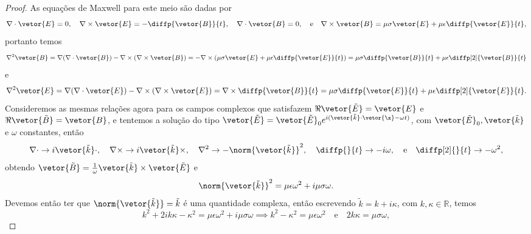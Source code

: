 \begin{proof}
    As equações de Maxwell para este meio são dadas por
    \begin{equation*}
        \nabla \cdot \vetor{E} = 0,\quad
        \nabla \times \vetor{E} = -\diffp{\vetor{B}}{t},\quad
        \nabla \cdot \vetor{B} = 0,\quad\text{e}\quad
        \nabla \times \vetor{B} = \mu \sigma \vetor{E} + \mu \epsilon \diffp{\vetor{E}}{t},
    \end{equation*}
    portanto temos
    \begin{equation*}
        \nabla^2 \vetor{B} = \nabla ( \nabla \cdot \vetor{B}) - \nabla \times (\nabla \times \vetor{B}) = - \nabla \times \left(\mu \sigma \vetor{E} + \mu \epsilon \diffp{\vetor{E}}{t}\right) = \mu \sigma \diffp{\vetor{B}}{t} + \mu \epsilon \diffp[2]{\vetor{B}}{t}
    \end{equation*}
    e
    \begin{equation*}
        \nabla^2 \vetor{E} = \nabla ( \nabla \cdot \vetor{E}) - \nabla \times (\nabla \times \vetor{E}) = \nabla \times \diffp{\vetor{B}}{t} = \mu \sigma \diffp{\vetor{E}}{t} + \mu \epsilon \diffp[2]{\vetor{E}}{t}.
    \end{equation*}
    Consideremos as mesmas relações agora para os campos complexos que satisfazem \(\Re{\vetor{\tilde{E}}}= \vetor{E}\) e \(\Re{\vetor{\tilde{B}}}= \vetor{B}\), e tentemos a solução do tipo \(\vetor{\tilde{E}} = \vetor{\tilde{E}}_0e^{i(\vetor{\tilde{k}}\cdot\vetor{\x} - \omega t)}\), com \(\vetor{\tilde{E}}_0, \vetor{\tilde{k}}\) e \(\omega\) constantes, então
    \begin{equation*}
        \nabla \cdot \to i\vetor{\tilde{k}} \cdot,\quad
        \nabla \times \to i \vetor{\tilde{k}} \times,\quad
        \nabla^2 \to - \norm{\vetor{\tilde{k}}}^2,\quad
        \diffp{}{t} \to -i\omega,\quad \text{e}\quad
        \diffp[2]{}{t} \to -\omega^2,
    \end{equation*}
    obtendo \(\vetor{\tilde{B}} = \frac{1}{\omega} \vetor{\tilde{k}} \times \vetor{\tilde{E}}\) e
    \begin{equation*}
        \norm{\vetor{\tilde{k}}}^2 = \mu \epsilon \omega^2+i\mu \sigma \omega.
    \end{equation*}
    Devemos então ter que \(\norm{\vetor{\tilde{k}}} = \tilde{k}\) é uma quantidade complexa, então escrevendo \(\tilde{k} = k + i \kappa\), com \(k, \kappa \in \mathbb{R}\), temos
    \begin{equation*}
        k^2 + 2ik \kappa - \kappa^2 = \mu \epsilon \omega^2 + i\mu \sigma \omega \implies k^2 - \kappa^2 = \mu \epsilon \omega^2 \quad\text{e}\quad 2 k \kappa = \mu \sigma \omega,

\end{equation*}
\end{proof}
